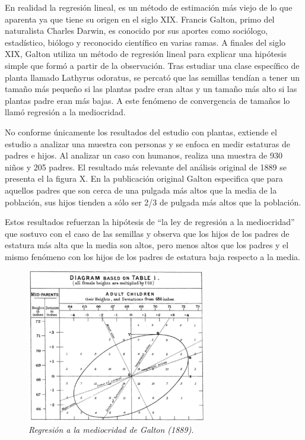 \documentclass[letterpaper,12pt, spanish, oneside]{book} %
\begin{document}
En realidad la regresión lineal, es un método de estimación más viejo de lo que aparenta ya que tiene su origen en el siglo XIX. Francis Galton, primo del naturalista Charles Darwin, es conocido por sus aportes como sociólogo,  estadístico, biólogo y reconocido científico en varias ramas. A finales del siglo XIX, Galton utiliza un método de regresión lineal para explicar una hipótesis simple que formó a partir de la observación. Tras estudiar una clase específico de planta llamado Lathyrus odoratus, se percató que las semillas tendían a tener un tamaño más pequeño si las plantas padre eran altas y un tamaño más alto si las plantas padre eran más bajas. A este fenómeno de convergencia de tamaños lo llamó regresión a la mediocridad. 

No conforme únicamente los resultados del estudio con plantas, extiende el estudio a analizar una muestra con personas y se enfoca en medir estaturas de padres e hijos. Al analizar un caso con humanos, realiza una muestra de 930 niños y 205 padres. El resultado más relevante del análisis original de 1889 se presenta el la figura X. En la publicación original Galton especifica que para aquellos padres que son cerca de una pulgada más altos que la media de la población, sus hijos tienden a sólo ser 2/3 de pulgada más altos que la población. 

Estos resultados refuerzan la hipótesis de “la ley de regresión a la mediocridad” que sostuvo con el caso de las semillas y observa que los hijos de los padres de estatura más alta que la media son altos, pero menos altos que los padres y el mismo fenómeno con los hijos de los padres de estatura baja respecto a la media.

\begin{figure}[H]
\centering
\includegraphics[width=0.7\textwidth]{galton1}
\caption{\label{fig:frog2}\textit{Regresión a la mediocridad de Galton (1889)}.}
\end{figure}
\end{document}
